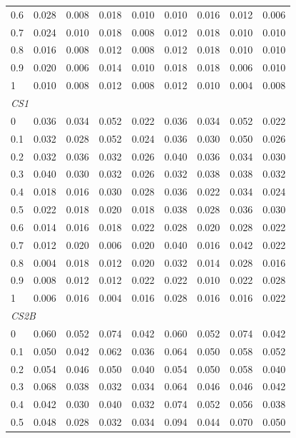 \begin{table}[htbp]
\begin{tabular}{lcccccccc}
0.6 & 0.028 & 0.008 & 0.018 & 0.010 & 0.010 & 0.016 & 0.012 & 0.006 \\
0.7 & 0.024 & 0.010 & 0.018 & 0.008 & 0.012 & 0.018 & 0.010 & 0.010 \\
0.8 & 0.016 & 0.008 & 0.012 & 0.008 & 0.012 & 0.018 & 0.010 & 0.010 \\
0.9 & 0.020 & 0.006 & 0.014 & 0.010 & 0.018 & 0.018 & 0.006 & 0.010 \\
1 & 0.010 & 0.008 & 0.012 & 0.008 & 0.012 & 0.010 & 0.004 & 0.008 \\
\midrule
\multicolumn{9}{l}{\textit{CS1}} \\
0 & 0.036 & 0.034 & 0.052 & 0.022 & 0.036 & 0.034 & 0.052 & 0.022 \\
0.1 & 0.032 & 0.028 & 0.052 & 0.024 & 0.036 & 0.030 & 0.050 & 0.026 \\
0.2 & 0.032 & 0.036 & 0.032 & 0.026 & 0.040 & 0.036 & 0.034 & 0.030 \\
0.3 & 0.040 & 0.030 & 0.032 & 0.026 & 0.032 & 0.038 & 0.038 & 0.032 \\
0.4 & 0.018 & 0.016 & 0.030 & 0.028 & 0.036 & 0.022 & 0.034 & 0.024 \\
0.5 & 0.022 & 0.018 & 0.020 & 0.018 & 0.038 & 0.028 & 0.036 & 0.030 \\
0.6 & 0.014 & 0.016 & 0.018 & 0.022 & 0.028 & 0.020 & 0.028 & 0.022 \\
0.7 & 0.012 & 0.020 & 0.006 & 0.020 & 0.040 & 0.016 & 0.042 & 0.022 \\
0.8 & 0.004 & 0.018 & 0.012 & 0.020 & 0.032 & 0.014 & 0.028 & 0.016 \\
0.9 & 0.008 & 0.012 & 0.012 & 0.022 & 0.022 & 0.010 & 0.022 & 0.028 \\
1 & 0.006 & 0.016 & 0.004 & 0.016 & 0.028 & 0.016 & 0.016 & 0.022 \\
\midrule
\multicolumn{9}{l}{\textit{CS2B}} \\
0 & 0.060 & 0.052 & 0.074 & 0.042 & 0.060 & 0.052 & 0.074 & 0.042 \\
0.1 & 0.050 & 0.042 & 0.062 & 0.036 & 0.064 & 0.050 & 0.058 & 0.052 \\
0.2 & 0.054 & 0.046 & 0.050 & 0.040 & 0.054 & 0.050 & 0.058 & 0.040 \\
0.3 & 0.068 & 0.038 & 0.032 & 0.034 & 0.064 & 0.046 & 0.046 & 0.042 \\
0.4 & 0.042 & 0.030 & 0.040 & 0.032 & 0.074 & 0.052 & 0.056 & 0.038 \\
0.5 & 0.048 & 0.028 & 0.032 & 0.034 & 0.094 & 0.044 & 0.070 & 0.050 \\

\end{tabular}
\end{table}
